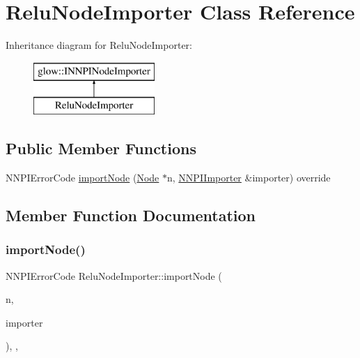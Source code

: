 \hypertarget{class_relu_node_importer}{}\section{Relu\+Node\+Importer Class Reference}
\label{class_relu_node_importer}
Inheritance diagram for Relu\+Node\+Importer\+:\begin{figure}[H]
\begin{center}
\leavevmode
\includegraphics[height=2.000000cm]{class_relu_node_importer}
\end{center}
\end{figure}
\subsection*{Public Member Functions}
\begin{DoxyCompactItemize}
\item 
N\+N\+P\+I\+Error\+Code \hyperlink{class_relu_node_importer_a32690710b7a4cf75df05d738ea0e278a}{import\+Node} (\hyperlink{classglow_1_1_node}{Node} $\ast$n, \hyperlink{classglow_1_1_n_n_p_i_importer}{N\+N\+P\+I\+Importer} \&importer) override
\end{DoxyCompactItemize}


\subsection{Member Function Documentation}
\mbox{\label{class_relu_node_importer_a32690710b7a4cf75df05d738ea0e278a}} 
\subsubsection{\texorpdfstring{import\+Node()}{importNode()}}
{\footnotesize\ttfamily N\+N\+P\+I\+Error\+Code Relu\+Node\+Importer\+::import\+Node (\begin{DoxyParamCaption}\item[{\hyperlink{classglow_1_1_node}{Node} $\ast$}]{n,  }\item[{\hyperlink{classglow_1_1_n_n_p_i_importer}{N\+N\+P\+I\+Importer} \&}]{importer }\end{DoxyParamCaption})\hspace{0.3cm}{\ttfamily [inline]}, {\ttfamily [override]}, {\ttfamily [virtual]}}


